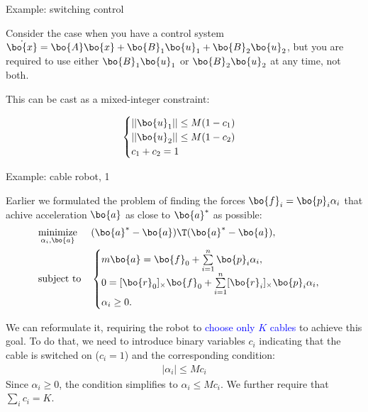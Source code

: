 \documentclass{beamer}
\begin{document}
\begin{frame}{Example: switching control}
	\begin{flushleft}
		
		Consider the case when you have a control system $\dot{\bo{x}} =\bo{A}\bo{x} + \bo{B}_1\bo{u}_1 + \bo{B}_2\bo{u}_2$, but you are required to use either $\bo{B}_1\bo{u}_1$ or $\bo{B}_2\bo{u}_2$ at any time, not both.
		
		\bigskip
		
		This can be cast as a mixed-integer constraint:
		
		\begin{equation}
			\begin{cases}
				||\bo{u}_1|| \leq M (1 - c_1) \\
				||\bo{u}_2|| \leq M (1 - c_2) \\
				c_1 + c_2 = 1
			\end{cases}
		\end{equation}
		
	\end{flushleft}
\end{frame}





\begin{frame}{Example: cable robot, 1}
	\begin{flushleft}
		
		Earlier we formulated the problem of finding the forces $\bo{f}_i  = \bo{p}_i \alpha_i$ that achive acceleration $\bo{a}$ as close to $\bo{a}^*$ as possible:
		\begin{equation}
			\begin{aligned}
				& \underset{\alpha_i, \bo{a}}{\text{minimize}}
				& & (\bo{a}^* - \bo{a})\T (\bo{a}^* - \bo{a}), 
				\\
				& \text{subject to}
				& & \begin{cases}
					m \bo{a} = \bo{f}_0 + \sum\limits_{i = 1}^{n} \bo{p}_i \alpha_i,
					\\
					0 = [\bo{r}_0]_\times \bo{f}_0 + \sum\limits_{i = 1}^{n} [\bo{r}_i]_\times \bo{p}_i \alpha_i,
					\\
					\alpha_i \geq 0.
				\end{cases}
			\end{aligned}
		\end{equation}
		
		We can reformulate it, requiring the robot to \textcolor{blue}{choose only $K$ cables} to achieve this goal. To do that, we need to introduce binary variables $c_i$ indicating that the cable is switched on ($c_i = 1$) and the corresponding condition:
		 \begin{align}
		 	| \alpha_i | \leq M c_i 
		 \end{align}
		 Since $\alpha_i \geq 0$, the condition simplifies to $\alpha_i \leq M c_i$. We further require that $\sum\limits_i c_i = K$.
		
	\end{flushleft}
\end{frame}
\end{document}
